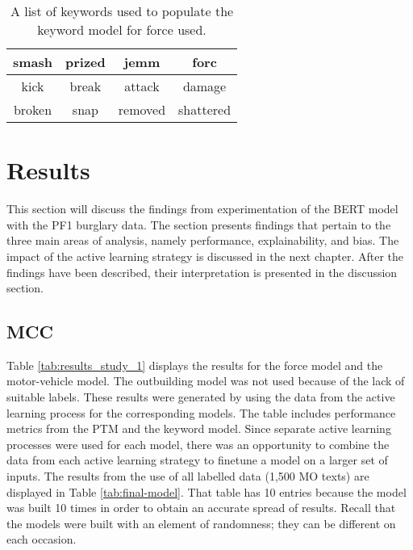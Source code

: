 \begin{table}[]
\begin{tabular}{|c|c|c|c|}
\hline
smash  & prized & jemm    & forc      \\ \hline
kick   & break  & attack  & damage    \\ \hline
broken & snap   & removed & shattered \\ \hline
\end{tabular}
\caption[Keywords for keyword model - force used]{\label{tab:Keywords_force} A list of keywords used to populate the keyword model for force used.}
\end{table}


\section{Results} This section will discuss the findings from experimentation of the BERT model with the PF1 burglary data. The section presents findings that pertain to the three main areas of analysis, namely performance, explainability, and bias. The impact of the active learning strategy is discussed in the next chapter. After the findings have been described, their interpretation is presented in the discussion section.


\subsection{MCC} Table \ref{tab:results_study_1} displays the results for the force model and the motor-vehicle model. The outbuilding model was not used because of the lack of suitable labels. These results were generated by using the data from the active learning process for the corresponding models. The table includes performance metrics from the PTM and the keyword model. Since separate active learning processes were used for each model, there was an opportunity to combine the data from each active learning strategy to finetune a model on a larger set of inputs. The results from the use of all labelled data (1,500 MO texts) are displayed in Table \ref{tab:final-model}. That table has 10 entries because the model was built 10 times in order to obtain an accurate spread of results. Recall that the models were built with an element of randomness; they can be different on each occasion. 

